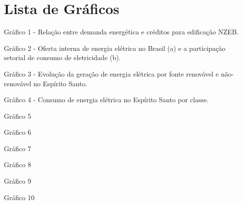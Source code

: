 \section*{Lista de Gráficos}
\vspace*{1.5cm} %
\thispagestyle{empty}
    \begin{onehalfspace}
        Gráfico 1 - Relação entre demanda energética e créditos para edificação NZEB.\par
        Gráfico 2 - Oferta interna de energia elétrica no Brasil (a) e a 
        participação setorial de consumo de eletricidade (b).\par
        Gráfico 3 - Evolução da geração de energia elétrica por fonte renovável e não-renovável no Espírito Santo.\par
        Gráfico 4 - Consumo de energia elétrica no Espírito Santo por classe.\par
        Gráfico 5\par
        Gráfico 6\par
        Gráfico 7\par
        Gráfico 8\par
        Gráfico 9\par
        Gráfico 10\par
    \end{onehalfspace}